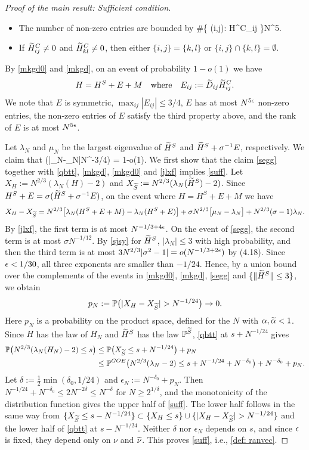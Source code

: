 \begin{proof}[Proof of the main result: Sufficient condition]
\begin{itemize}
\item The number of non-zero entries are bounded by
\be
\#\{ (i,j): \wt H^C_{ij}   \}\leq N^{5\e}.
\ee
\item If $\widetilde{H}^C_{ij}\neq 0$ and $\widetilde{H}^C_{kl}\neq 0$, then either $\{i,j\}=\{k,l\}$ or $\{i,j\}\cap \{ k,l \}= \emptyset$.
\end{itemize}

By \eqref{mkgd0} and \eqref{mkgd}, on an event of probability $1-o(1)$ we have
$$
H=H^S  +  E + M \quad {\rm where} \quad E_{ij}:=  \widetilde D_{ij}\widetilde H^C_{ij}.
$$
We note that $E$ is symmetric, $\max_{ij}|E_{ij}|\leq 3/4$, $E$ has at most $N^{5\epsilon}$ non-zero entries, the non-zero entries of $E$ satisfy the third property above, and the rank of $E$ is at most $N^{5\epsilon}$.

Let $\lambda_N$ and $\mu_N$ be the largest eigenvalue of $\widetilde H^S$ and $\widetilde H^S + \sigma^{-1}E$, respectively. We claim that
\be\label{segg}
\p\left(|\lambda_N-\mu_N|\leq N^{-3/4}\right) = 1-o(1).
\ee
We first show that the claim \eqref{segg} together with \eqref{qbtt}, \eqref{mkgd}, \eqref{mkgd0} and \eqref{jlxf} implies \eqref{suff}. Let $X_H:=N^{2/3}(\lambda_N(H)-2)$ and $X_{\widetilde S}:=N^{2/3}(\lambda_N(\widetilde H^S)-2)$. Since $H^S+E=\sigma(\widetilde H^S+\sigma^{-1}E)$, on the event where $H=H^S+E+M$ we have
$$
X_H-X_{\widetilde S}=N^{2/3}\big[\lambda_N(H^S+E+M)-\lambda_N(H^S+E)\big]+\sigma N^{2/3}\big[\mu_N-\lambda_N\big]+N^{2/3}(\sigma-1)\lambda_N.
$$
By \eqref{jlxf}, the first term is at most $N^{-1/3+4\epsilon}$. On the event of \eqref{segg}, the second term is at most $\sigma N^{-1/12}$. By \eqref{sjsy} for $\widetilde H^S$, $|\lambda_N|\le3$ with high probability, and then the third term is at most $3N^{2/3}|\sigma^2-1|=o(N^{-1/3+2\epsilon})$ by (4.18). Since $\epsilon<1/30$, all three exponents are smaller than $-1/24$. Hence, by a union bound over the complements of the events in \eqref{mkgd0}, \eqref{mkgd}, \eqref{segg} and $\{\|\widetilde H^S\|\le3\}$, we obtain
$$
p_N:=\p\big(|X_H-X_{\wt S}|>N^{-1/24}\big)\to0 .
$$
Here $p_N$ is a probability on the product space, defined for the $N$ with $\alpha,\widetilde{\alpha}<1$. Since $H$ has the law of $H_N$ and $\widetilde H^S$ has the law $\mathbb{P}^{\widetilde S}$, \eqref{qbtt} at $s+N^{-1/24}$ gives
\[ \begin{split}
\mathbb{P}\big(N^{2/3}(\lambda_N(H_N)-2)\le s\big)&\le\mathbb{P}\big(X_{\widetilde S}\le s+N^{-1/24}\big)+p_N\\
&\le\mathbb{P}^{GOE}\big(N^{2/3}(\lambda_N-2)\le s+N^{-1/24}+N^{-\delta_0}\big)+N^{-\delta_0}+p_N .
\end{split} \]
Let $\delta:=\frac12\min(\delta_0,1/24)$ and $\epsilon_N:=N^{-\delta_0}+p_N$. Then $N^{-1/24}+N^{-\delta_0}\le2N^{-2\delta}\le N^{-\delta}$ for $N\ge2^{1/\delta}$, and the monotonicity of the distribution function gives the upper half of \eqref{suff}. The lower half follows in the same way from $\{X_{\wt S}\le s-N^{-1/24}\}\subset\{X_H\le s\}\cup\{|X_H-X_{\wt S}|>N^{-1/24}\}$ and the lower half of \eqref{qbtt} at $s-N^{-1/24}$. Neither $\delta$ nor $\epsilon_N$ depends on $s$, and since $\epsilon$ is fixed, they depend only on $\nu$ and $\widetilde\nu$. This proves \eqref{suff}, i.e., \eqref{def: ranvec}.


\end{proof}
